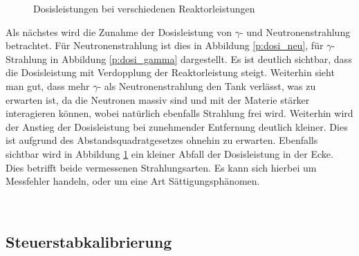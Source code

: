         \begin{figure}
            \caption{Dosisleistungen bei verschiedenen Reaktorleistungen}
            \label{df:dosi_g_n}                    
        \end{figure}
    Als nächstes wird die Zunahme der Dosisleistung von $\gamma$- und Neutronenstrahlung betrachtet. Für Neutronenstrahlung ist dies in Abbildung \ref{p:dosi_neu}, für $\gamma$-Strahlung in Abbildung \ref{p:dosi_gamma} dargestellt.
    Es ist deutlich sichtbar, dass die Dosisleistung mit Verdopplung der Reaktorleistung steigt. Weiterhin sieht man gut, dass mehr $\gamma$- als Neutronenstrahlung den Tank verlässt, was zu erwarten ist, da die Neutronen massiv sind und mit der Materie stärker interagieren können, wobei natürlich ebenfalls Strahlung frei wird.
    Weiterhin wird der Anstieg der Dosisleistung bei zunehmender Entfernung deutlich kleiner. Dies ist aufgrund des Abstandsquadratgesetzes ohnehin zu erwarten.
    Ebenfalls sichtbar wird in Abbildung \ref{df:dosi_g_n} ein kleiner Abfall der Dosisleistung in der Ecke. Dies betrifft beide vermessenen Strahlungsarten. Es kann sich hierbei um Messfehler handeln, oder um eine Art Sättigungsphänomen.
    
    \ \\    


    \subsection{Steuerstabkalibrierung}

